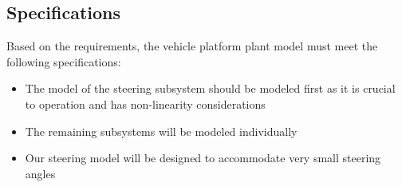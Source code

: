 \documentclass[12pt]{article} %
\begin{document}
\subsection{Specifications}
Based on the requirements, the vehicle platform plant model must meet the following specifications:
\begin{itemize}
    \item The model of the steering subsystem should be modeled first as it is crucial to operation and has non-linearity considerations
    \item The remaining subsystems will be modeled individually 
    \item Our steering model will be designed to accommodate very small steering angles
\end{itemize}

\end{document}
